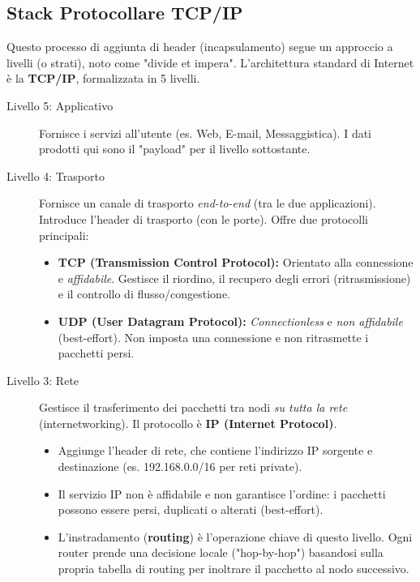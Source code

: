 \documentclass[../main.tex]{subfiles}
\begin{document}
\subsection{Stack Protocollare TCP/IP}
Questo processo di aggiunta di header (incapsulamento) segue un approccio a livelli (o strati), noto come "divide et impera". L'architettura standard di Internet è la \textbf{TCP/IP}, formalizzata in 5 livelli.


\begin{description}
    \item[Livello 5: Applicativo]
    Fornisce i servizi all'utente (es. Web, E-mail, Messaggistica). I dati prodotti qui sono il "payload" per il livello sottostante.

    \item[Livello 4: Trasporto]
    Fornisce un canale di trasporto \emph{end-to-end} (tra le due applicazioni). Introduce l'header di trasporto (con le porte). Offre due protocolli principali:
    \begin{itemize}
        \item \textbf{TCP (Transmission Control Protocol):} Orientato alla connessione e \emph{affidabile}. Gestisce il riordino, il recupero degli errori (ritrasmissione) e il controllo di flusso/congestione.
        \item \textbf{UDP (User Datagram Protocol):} \emph{Connectionless} e \emph{non affidabile} (best-effort). Non imposta una connessione e non ritrasmette i pacchetti persi.
    \end{itemize}

    \item[Livello 3: Rete]
    Gestisce il trasferimento dei pacchetti tra nodi \emph{su tutta la rete} (internetworking). Il protocollo è \textbf{IP (Internet Protocol)}.
    \begin{itemize}
        \item Aggiunge l'header di rete, che contiene l'indirizzo IP sorgente e destinazione (es. 192.168.0.0/16 per reti private).
        \item Il servizio IP non è affidabile e non garantisce l'ordine: i pacchetti possono essere persi, duplicati o alterati (best-effort).
        \item L'instradamento (\textbf{routing}) è l'operazione chiave di questo livello. Ogni router prende una decisione locale ("hop-by-hop") basandosi sulla propria tabella di routing per inoltrare il pacchetto al nodo successivo.
    \end{itemize}


\end{description}
\end{document}

